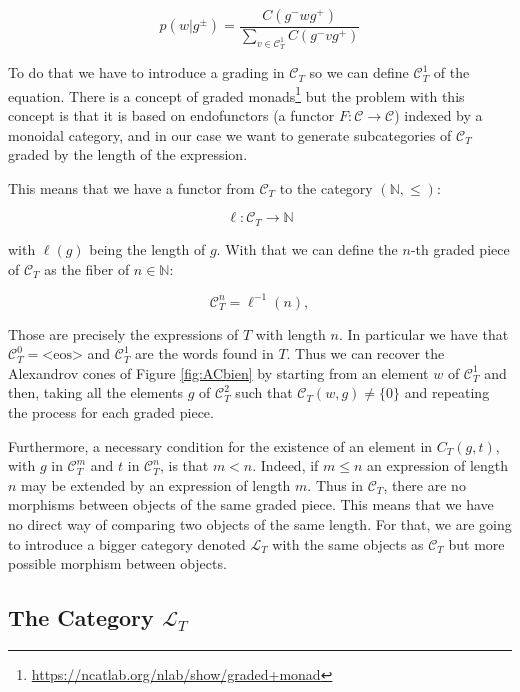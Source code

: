 \documentclass[10pt,a4paper]{elsarticle}
\renewcommand{\Bbb}{\mathbb}
\newcommand{\N}{\Bbb{N}}
\newcommand{\C}{\mathcal{C}}
\renewcommand{\L}{\mathcal{L}}
\begin{document}
\begin{equation}\label{eq:pw2v}
	p(w|g^{\pm})=\frac{C(g^{-}wg^{+})}{\sum_{v\in \C_{T}^{1}}C(g^{-}v	g^{+})}
\end{equation}

To do that we have to introduce a grading in $\C_{T}$ so we can define $\C_{T}^{1}$ of the equation. There is a concept of graded monads\footnote{\url{https://ncatlab.org/nlab/show/graded+monad}} but the problem with this concept is that it is based on endofunctors (a functor $F\colon \C\to\C$) indexed by a monoidal category, and in our case we want to generate subcategories of $\C_{T}$ graded by the length of the expression.  

This means that we have a functor from $\C_{T}$ to the category $(\N,\leq)$:

\begin{equation}
	\ell \colon \C_{T}\to \N
\end{equation}

with $\ell(g)$ being the length of $g$. With that we can define the $n$-th graded piece of $\C_{T}$ as the fiber of $n\in \N$: 

\begin{equation}
	\C_{T}^{n}=\ell^{-1}(n),
\end{equation}

Those are precisely the expressions of $T$ with length $n$. In particular we have that $\C_{T}^{0}=\text{<eos>}$ and $\C_{T}^{1}$ are the words found in $T$. Thus we can recover the Alexandrov cones of Figure \ref{fig:ACbien} by starting from an element $w$ of $\C_{T}^{1}$ and then, taking all the elements $g$ of $\C_{T}^{2}$ such that $\C_{T}(w,g)\neq\{0\}$ and repeating the process for each graded piece.

Furthermore, a necessary condition for the existence of an element in $C_{T}(g,t)$, with $g$ in $\C_{T}^{m}$ and $t$ in $\C_{T}^{n}$, is that $m < n$. Indeed, if $m\leq n$ an expression of length $n$ may be extended by an expression of length $m$. Thus in $\C_T$, there are no morphisms between objects of the same graded piece. This means that we have no direct way of comparing two objects of the same length. For that, we are going to introduce a bigger category denoted $\L_{T}$ with the same objects as $\C_{T}$ but more possible morphism between objects.


\subsection{The Category $\mathcal{L}_{T}$}
\end{document}
